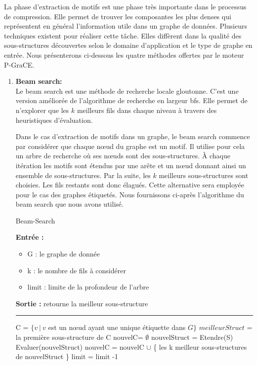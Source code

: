 \documentclass[a4paper,oneside,12pt]{report}
\theoremstyle{definition}
\begin{document}
La phase d'extraction de motifs est une phase très importante	 dans le processus de compression. Elle permet de trouver les composantes les plus denses qui représentent en général l'information utile dans un graphe de données. Plusieurs techniques existent pour réaliser cette tâche. Elles diffèrent dans la qualité des sous-structures découvertes selon le domaine d'application et le type de graphe en entrée. Nous présenterons ci-dessous les quatre méthodes offertes par le moteur P-GraCE.
		
\begin{enumerate}

\item \textbf{Beam search:}\\
Le beam search est une méthode de recherche locale gloutonne. C'est une version améliorée de l'algorithme de recherche en largeur \gls{bfs}. Elle permet de n'explorer que les $k$ meilleurs fils dans chaque niveau à travers des heuristiques d'évaluation.

Dans le cas d'extraction de motifs dans un graphe, le beam search commence par considérer que chaque nœud du graphe est un motif. Il utilise pour cela un arbre de recherche où ses nœuds sont des sous-structures. À chaque itération les motifs sont étendus par une arête et un nœud donnant ainsi un ensemble de sous-structures. Par la suite, les $k$ meilleurs sous-structures sont choisies. Les fils restants sont donc élagués. %
Cette alternative sera employée pour le cas des graphes étiquetés. Nous fournissons ci-après l'algorithme du beam search que nous avons utilisé. 


\begin{algorithm}[H]
					\label{alg:beamSearch}
					\caption{Beam-Search}
					\textbf{Entrée :}
						\begin{itemize}[label=$\bullet$]
							\item G : le graphe de donnée
							\item k : le nombre de fils à considérer
							\item limit : limite de la profondeur de l'arbre
						\end{itemize}
					\textbf{Sortie :} retourne la meilleur sous-structure\\							\noindent\rule{\textwidth}{1pt}
						
						
				\begin{algorithmic} [1]
					\STATE C = $\{v\ |\ v$ est un nœud ayant une unique étiquette dans  $G\}$
					\STATE $meilleurStruct$ = la première sous-structure de C
					\REPEAT
					\STATE nouvelC= $\emptyset$
						\STATE nouvelStruct = Etendre(S)
						\STATE Evaluer(nouvelStruct)
						\STATE nouvelC = nouvelC $\cup$ \{ les k meilleur sous-structures de nouvelStruct \}
					\ENDFOR
					\STATE limit = limit -1
					

\end{algorithmic}
\end{algorithm}
\end{enumerate}
\end{document}
